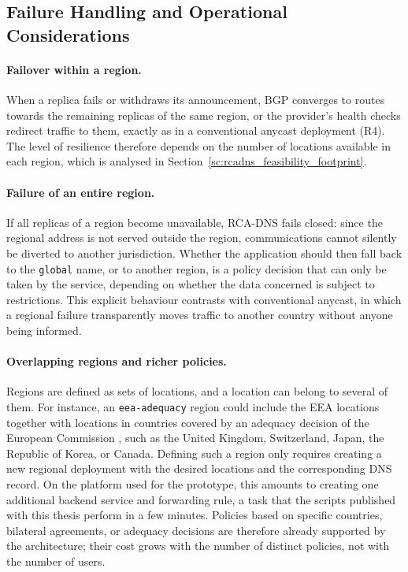 \documentclass[
A4paper,                %
twoside,                %
openright,              %
chapterprefix=true,     %
12pt,                   %
headings=normal,        %
titlepage=on            %
]{book}
\providecommand{\DIFaddend}{} %
\DeclareRobustCommand{\DIFaddend}{\DIFOaddend \let\includegraphics\DIFOincludegraphics} %
\begin{document}
\DIFaddend \subsection{Failure Handling and Operational Considerations}
\label{sc:rcadns_operations}

\paragraph{Failover within a region.} When a replica fails or withdraws its announcement, BGP converges to routes towards the remaining replicas of the same region, or the provider's health checks redirect traffic to them, exactly as in a conventional anycast deployment (R4). The level of resilience therefore depends on the number of locations available in each region, which is analysed in Section~\ref{sc:rcadns_feasibility_footprint}.

\paragraph{Failure of an entire region.} If all replicas of a region become unavailable, RCA-DNS fails closed: since the regional address is not served outside the region, communications cannot silently be diverted to another jurisdiction. Whether the application should then fall back to the \texttt{global} name, or to another region, is a policy decision that can only be taken by the service, depending on whether the data concerned is subject to restrictions. This explicit behaviour contrasts with conventional anycast, in which a regional failure transparently moves traffic to another country without anyone being informed.

\paragraph{Overlapping regions and richer policies.} Regions are defined as sets of locations, and a location can belong to several of them. For instance, an \texttt{eea-adequacy} region could include the EEA locations together with locations in countries covered by an adequacy decision of the European Commission \cite{DataCountries}, such as the United Kingdom, Switzerland, Japan, the Republic of Korea, or Canada. Defining such a region only requires creating a new regional deployment with the desired locations and the corresponding DNS record. On the platform used for the prototype, this amounts to creating one additional backend service and forwarding rule, a task that the scripts published with this thesis perform in a few minutes. Policies based on specific countries, bilateral agreements, or adequacy decisions are therefore already supported by the architecture; their cost grows with the number of distinct policies, not with the number of users.
\end{document}
